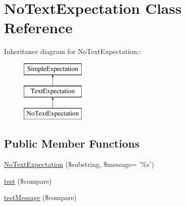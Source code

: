 \hypertarget{class_no_text_expectation}{
\section{NoTextExpectation Class Reference}
\label{class_no_text_expectation}
}
Inheritance diagram for NoTextExpectation::\begin{figure}[H]
\begin{center}
\leavevmode
\includegraphics[height=3cm]{class_no_text_expectation}
\end{center}
\end{figure}
\subsection*{Public Member Functions}
\begin{DoxyCompactItemize}
\item 
\hyperlink{class_no_text_expectation_a5fa890c550df5e3ecf2e17719fac8412}{NoTextExpectation} (\$substring, \$message= '\%s')
\item 
\hyperlink{class_no_text_expectation_aea5e85eb1d03d5f48cb463f09d756a9e}{test} (\$compare)
\item 
\hyperlink{class_no_text_expectation_ab233e35e0f5912da893c34c8eda835fc}{testMessage} (\$compare)
\end{DoxyCompactItemize}


